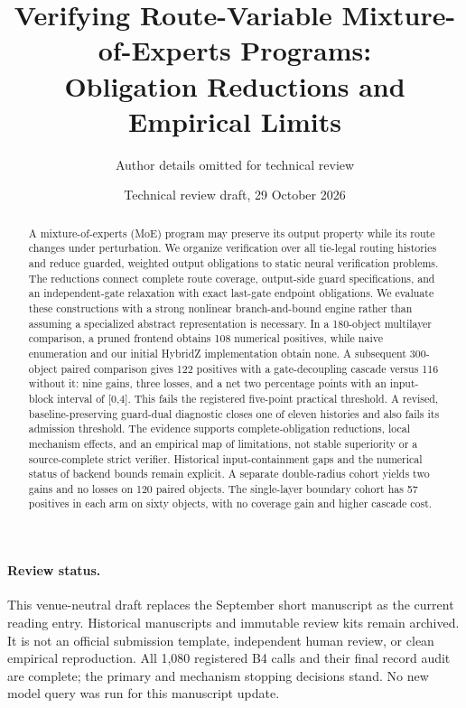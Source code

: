 \documentclass[11pt]{article}
\title{Verifying Route-Variable Mixture-of-Experts Programs:\\Obligation Reductions and Empirical Limits}
\author{Author details omitted for technical review}
\date{Technical review draft, 29 October 2026}
\begin{document}
\maketitle
\begin{abstract}
A mixture-of-experts (MoE) program may preserve its output property while its
route changes under perturbation. We organize verification over all tie-legal
routing histories and reduce guarded, weighted output obligations to static
neural verification problems. The reductions connect complete route coverage,
output-side guard specifications, and an independent-gate relaxation with exact
last-gate endpoint obligations. We evaluate these constructions with a strong
nonlinear branch-and-bound engine rather than assuming a specialized abstract
representation is necessary. In a 180-object multilayer comparison, a pruned
frontend obtains 108 numerical positives, while naive enumeration and our
initial HybridZ implementation obtain none. A subsequent 300-object paired
comparison gives 122 positives with a gate-decoupling cascade versus 116
without it: nine gains, three losses, and a net two percentage points with an
input-block interval of [0,4]. This fails the registered five-point practical
threshold. A revised, baseline-preserving guard-dual diagnostic closes one of
eleven histories and also fails its admission threshold. The evidence supports
complete-obligation reductions, local mechanism effects, and an empirical map
of limitations, not stable superiority or a source-complete strict verifier.
Historical input-containment gaps and the numerical status of backend bounds
remain explicit. A separate double-radius cohort yields two gains and no losses
on 120 paired objects. The single-layer boundary cohort has 57 positives in
each arm on sixty objects, with no coverage gain and higher cascade cost.
\end{abstract}

\paragraph{Review status.}
This venue-neutral draft replaces the September short manuscript as the current
reading entry. Historical manuscripts and immutable review kits remain archived.
It is not an official submission template, independent human review, or clean
empirical reproduction. All 1,080 registered B4 calls and their final record
audit are complete; the primary and mechanism stopping decisions stand.
No new model query was run
for this manuscript update.
\end{document}
